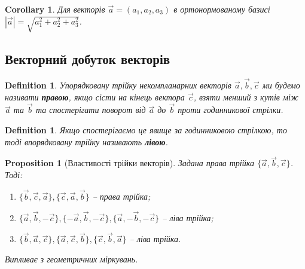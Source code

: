 \documentclass[a4paper, 10pt]{extarticle}
\theoremstyle{theoremdd}
\theoremstyle{theoremdd}
\newtheorem{definition}[theorem]{Definition}
\theoremstyle{theoremdd}
\theoremstyle{theoremdd}
\theoremstyle{theoremdd}
\newtheorem{proposition}[theorem]{Proposition}
\theoremstyle{theoremdd}
\theoremstyle{theoremdd}
\theoremstyle{theoremdd}
\newtheorem{corollary}[theorem]{Corollary}
\begin{document}
\begin{corollary}
	Для векторів $\vec{a} = (a_1, a_2, a_3)$ в ортонормованому базисі $|\vec{a}| = \sqrt{a_1^2 + a_2^2 + a_3^2}$.
\end{corollary}

\subsection{Векторний добуток векторів}
\begin{definition}
	Упорядковану трійку некомпланарних векторів $\vec{a}, \vec{b}, \vec{c}$ ми будемо називати \textbf{правою}, якщо сісти на кінець вектора $\vec{c}$, взяти менший з кутів між $\vec{a}$ та $\vec{b}$ та спостерігати поворот від $\vec{a}$ до $\vec{b}$ \textit{проти годинникової} стрілки.

\begin{figure}[H]
\centering
{}
\end{figure}
\end{definition}

\begin{definition}
	Якщо спостерігаємо це явище \textit{за годинниковою} стрілкою, то тоді впорядковану трійку називають \textbf{лівою}.
\begin{figure}[H]
\centering
{}
\end{figure}
\end{definition}

\begin{proposition}[Властивості трійки векторів]
\label{vector_trio_properties}
	Задана права трійка $\{\vec{a}, \vec{b}, \vec{c}\}$. Тоді:
	\begin{enumerate}[nosep,wide=0pt,label={\arabic*)}]
	\item $\{\vec{b}, \vec{c}, \vec{a}\}, \{\vec{c}, \vec{a}, \vec{b}\}$ -- права трійка;
	\item $\{\vec{a}, \vec{b}, -\vec{c}\}, \{-\vec{a}, \vec{b}, -\vec{c}\}, \{\vec{a}, -\vec{b}, -\vec{c}\}$ -- ліва трійка;
	\item $\{\vec{b}, \vec{a}, \vec{c}\}, \{\vec{a}, \vec{c}, \vec{b}\}, \{\vec{c}, \vec{b}, \vec{a}\}$ -- ліва трійка.
	\end{enumerate}
	\textit{Випливає з геометричних міркувань.}
\end{proposition}
\end{document}
